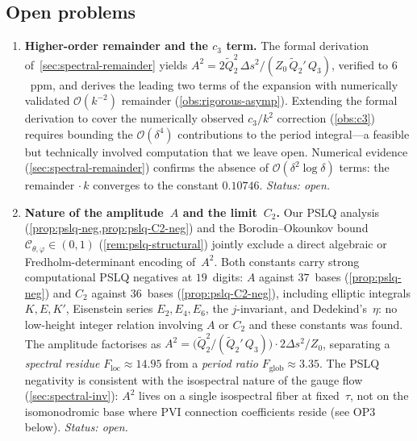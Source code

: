\documentclass[11pt,a4paper]{article}
\theoremstyle{plain}
\theoremstyle{definition}
\theoremstyle{remark}
\newcommand{\Oo}{\mathcal{O}}
\begin{document}
\subsection{Open problems}

\begin{enumerate}[label=\textbf{OP\arabic*.},nosep]
\item \textbf{Higher-order remainder and the $c_3$ term.}
  The formal derivation of~\cref{sec:spectral-remainder} yields
  $A^2 = 2\tilde Q_2^2\,\Delta s^2 / (Z_0\,\tilde Q_2'\,Q_3)$,
  verified to $6$~ppm, and derives the leading two terms of
  the expansion with numerically validated $\Oo(k^{-2})$ remainder
  (\cref{obs:rigorous-asymp}).  Extending the formal
  derivation to cover the numerically observed $c_3/k^2$
  correction (\cref{obs:c3}) requires bounding the
  $\Oo(\delta^4)$ contributions to the period integral---a
  feasible but technically involved computation that we
  leave open.
  Numerical evidence (\cref{sec:spectral-remainder}) confirms
  the absence of $\Oo(\delta^2 \log \delta)$ terms: the remainder
  $\cdot\,k$ converges to the constant $0.10746$.
  \emph{Status: open.}

\item \textbf{Nature of the amplitude~$A$ and the limit~$C_2$.}
  Our PSLQ analysis (\cref{prop:pslq-neg,prop:pslq-C2-neg}) and the
  Borodin--Okounkov bound
  $\mathcal{C}_{\theta,\varphi} \in (0,1)$
  (\cref{rem:pslq-structural}) jointly exclude a direct
  algebraic or Fredholm-determinant encoding of~$A^2$.
  Both constants carry strong computational PSLQ negatives
  at $19$~digits: $A$ against $37$~bases
  (\cref{prop:pslq-neg}) and $C_2$ against $36$~bases
  (\cref{prop:pslq-C2-neg}), including elliptic integrals
  $K, E, K'$, Eisenstein series $E_2, E_4, E_6$, the
  $j$-invariant, and Dedekind's~$\eta$: no low-height
  integer relation involving $A$ or $C_2$ and these
  constants was found.
  The amplitude factorises as
  $A^2 = \bigl(\tilde Q_2^2/(\tilde Q_2'\,Q_3)\bigr)
         \cdot 2\Delta s^2/Z_0$,
  separating a \emph{spectral residue}
  $F_{\mathrm{loc}} \approx 14.95$
  from a \emph{period ratio}
  $F_{\mathrm{glob}} \approx 3.35$.
  The PSLQ negativity is consistent with the
  isospectral nature of the gauge flow
  (\cref{sec:spectral-inv}): $A^2$ lives on a single
  isospectral fiber at fixed~$\tau$, not on the
  isomonodromic base where PVI connection coefficients
  reside (see OP3 below).
  \emph{Status: open.}


\end{enumerate}
\end{document}
